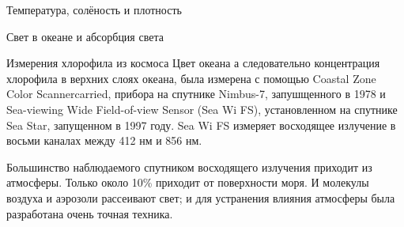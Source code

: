 \begin{chapter}{Температура, солёность и плотность}
\begin{section}{Свет в океане и абсорбция света}
\begin{paragraph}{Измерения хлорофила из космоса}
Цвет океана а следовательно концентрация хлорофила в верхних слоях
океана, была измерена с помощью Coastal Zone Color Scannercarried,
прибора на спутнике Nimbus-7, запушщенного в 1978 и Sea-viewing Wide
Field-of-view Sensor (Sea Wi FS), установленном на спутнике Sea Star,
запущенном в 1997 году. Sea Wi FS измеряет восходящее излучение в
восьми каналах между 412 нм и 856 нм.
%

Большинство наблюдаемого спутником восходящего излучения приходит из
атмосферы. Только около 10\% приходит от поверхности моря. И молекулы
воздуха и аэрозоли рассеивают свет; и для устранения влияния атмосферы
была разработана очень точная техника. 
%


\end{paragraph}
\end{section}
\end{chapter}
